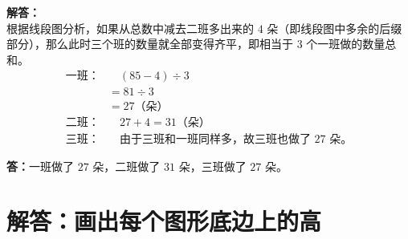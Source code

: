 \documentclass[12pt, a4paper]{ctexrep}
\begin{document}
\vspace{0.6cm}

\textbf{解答：}\\
根据线段图分析，如果从总数中减去二班多出来的 $4$ 朵（即线段图中多余的后缀部分），那么此时三个班的数量就全部变得齐平，即相当于 $3$ 个一班做的数量总和。
\begin{align*}
一班：& \quad (85 - 4) \div 3 \\
      & = 81 \div 3 \\
      & = 27\text{（朵）} \\[6pt]
二班：& \quad 27 + 4 = 31\text{（朵）} \\[6pt]
三班：& \quad \text{由于三班和一班同样多，故三班也做了 } 27\text{ 朵。}
\end{align*}

\noindent\textbf{答：}一班做了 $27$ 朵，二班做了 $31$ 朵，三班做了 $27$ 朵。

\newpage

\section{解答：画出每个图形底边上的高}

\vspace{0.6cm}
\end{document}
